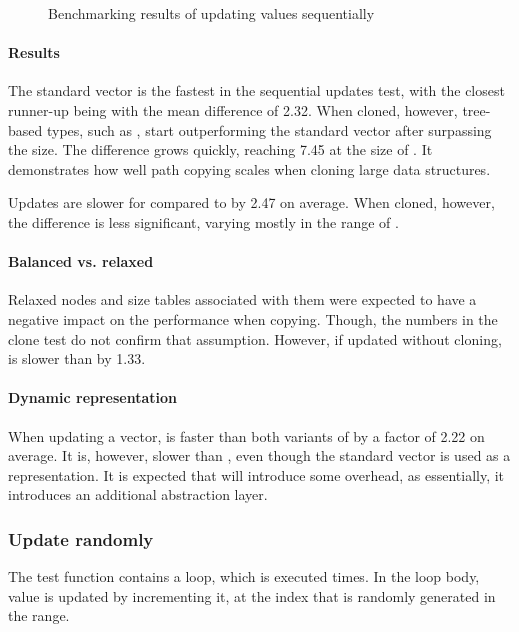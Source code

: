 \begin{figure}[!htbp]
    \caption{Benchmarking results of updating values sequentially}
    \label{fig:update-sequentially}
\end{figure}

\paragraph{Results}
The standard vector is the fastest in the sequential updates test, with the closest runner-up being \pvec{} with the mean difference of 2.32. When cloned, however, tree-based types, such as \rbvec{}, start outperforming the standard vector after surpassing the  size. The difference grows quickly, reaching 7.45 at the size of . It demonstrates how well path copying scales when cloning large data structures.

Updates are slower for \imrsvec{} compared to \rrbvec{} by 2.47 on average. When cloned, however, the difference is less significant, varying mostly in the range of \range{[20, 400]}.

\paragraph{Balanced vs. relaxed}
Relaxed nodes and size tables associated with them were expected to have a negative impact on the performance when copying. Though, the numbers in the clone test do not confirm that assumption. However, if updated without cloning, \rrbvec{} is slower than \rbvec{} by 1.33.

\paragraph{Dynamic representation}
When updating a vector, \pvec{} is faster than both variants of \rbvec{} by a factor of 2.22 on average. It is, however, slower than \stdvec{}, even though the standard vector is used as a representation. It is expected that \pvec{} will introduce some overhead, as essentially, it introduces an additional abstraction layer.

\subsubsection*{Update randomly}
The test function contains a loop, which is executed \n{} times. In the loop body, value is updated by incrementing it, at the index that is randomly generated in the \range{[0, N)} range.

